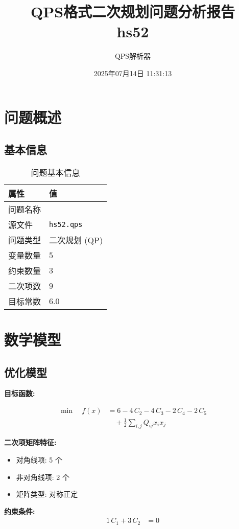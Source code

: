 \documentclass[a4paper,11pt]{article}
\title{QPS格式二次规划问题分析报告\\{\large hs52}}
\author{QPS解析器}
\date{2025年07月14日 11:31:13}
\begin{document}
\maketitle
\tableofcontents
\newpage

\section{问题概述}
\subsection{基本信息}
\begin{table}[h!]
\centering
\begin{tabular}{ll}
\toprule
\textbf{属性} & \textbf{值} \\
\midrule
问题名称 & \texttt{} \\
源文件 & \texttt{hs52.qps} \\
问题类型 & 二次规划 (QP) \\
变量数量 & 5 \\
约束数量 & 3 \\
二次项数 & 9 \\
目标常数 & 6.0 \\
\bottomrule
\end{tabular}
\caption{问题基本信息}
\end{table}

\section{数学模型}
\subsection{优化模型}

\textbf{目标函数:}

\begin{align}
\min\quad f(x) &= 6 - 4\,C_{2} - 4\,C_{3} - 2\,C_{4} - 2\,C_{5} \nonumber\\
&\quad + \frac{1}{2} \sum_{i,j} Q_{ij} x_i x_j\label{eq:objective}
\end{align}

\textbf{二次项矩阵特征:}
\begin{itemize}
\item 对角线项: 5 个
\item 非对角线项: 2 个
\item 矩阵类型: 对称正定
\end{itemize}

\textbf{约束条件:}
\begin{align}
1\,C_{1} + 3\,C_{2} &= 0 \nonumber
\end{align}
\end{document}
